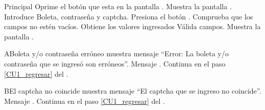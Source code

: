     \begin{UCtrayectoria}{Principal}
    \UCpaso[\UCactor] Oprime el botón  que esta en la pantalla .
    \UCpaso Muestra la pantalla .
	\UCpaso[\UCactor] Introduce Boleta, contraseña y captcha. \label{CU1_regresar} 
    \UCpaso[\UCactor] Presiona el botón .
    \UCpaso Comprueba que los campos no estén vacíos.  
    \UCpaso Obtiene los valores ingresados
    \UCpaso Válida campos. 
    \UCpaso Muestra la pantalla .
    \end{UCtrayectoria}
    
	\begin{UCtrayectoriaA}{A}{Boleta y/o contraseña erróneo}
		\UCpaso muestra mensaje “Error: La boleta y/o contraseña que se ingresó son erróneos”. Mensaje .
   		\UCpaso Continua en el paso \ref{CU1_regresar} del .
	\end{UCtrayectoriaA}
	
	\begin{UCtrayectoriaA}{B}{El captcha no coincide}
		\UCpaso muestra mensaje “El captcha que se ingreso no coincide”. Mensaje .
   		\UCpaso Continua en el paso \ref{CU1_regresar} del .
	\end{UCtrayectoriaA}
	


